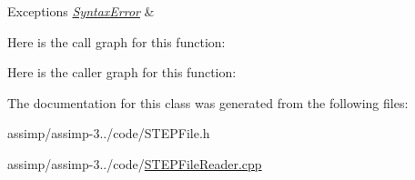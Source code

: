 \begin{DoxyExceptions}{Exceptions}
{\em \hyperlink{struct_assimp_1_1_s_t_e_p_1_1_syntax_error}{Syntax\+Error}} & \\
\hline
\end{DoxyExceptions}


Here is the call graph for this function\+:




Here is the caller graph for this function\+:




The documentation for this class was generated from the following files\+:\begin{DoxyCompactItemize}
\item 
assimp/assimp-\/3../code/S\+T\+E\+P\+File.\+h\item 
assimp/assimp-\/3../code/\hyperlink{_s_t_e_p_file_reader_8cpp}{S\+T\+E\+P\+File\+Reader.\+cpp}\end{DoxyCompactItemize}
